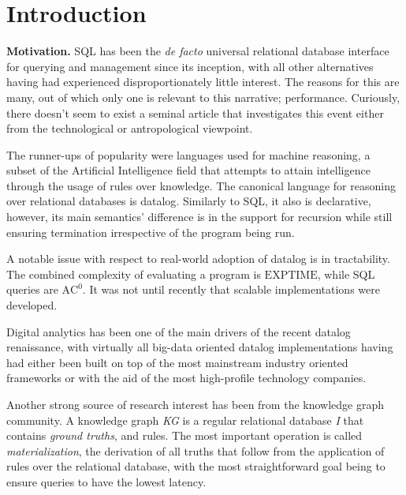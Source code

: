 \documentclass[manuscript,screen,review]{acmart}
\theoremstyle{definition}
\begin{document}

\maketitle

\section{Introduction}
\textbf{Motivation.} SQL has been the \textit{de facto} universal relational
database interface for querying and management since its inception,
with all other alternatives having had experienced disproportionately
little interest. The reasons for this are many, out of which only one
is relevant to this narrative; performance. Curiously, there doesn't seem to exist
a seminal article that investigates this event either from the
technological or antropological viewpoint.

The runner-ups of popularity were languages used for machine reasoning,
a subset of the Artificial Intelligence field that attempts to attain
intelligence through the usage of rules over knowledge. The canonical
language for reasoning over relational databases is datalog\cite{datalog}.
Similarly to SQL, it also is declarative, however, its main semantics' difference
is in the support for recursion while still ensuring termination irrespective
of the program being run.

A notable issue with respect to real-world adoption of datalog is in
tractability. The combined complexity of evaluating a program is
$\text{EXPTIME}$\cite{datalog}, while SQL queries are $\text{AC}^0$. It was
not until recently\cite{rdfox, others?} that scalable implementations were
developed.

Digital analytics has been one of the main drivers of the recent datalog renaissance,
with virtually all big-data oriented datalog implementations having had either been built
on top of the most mainstream industry oriented frameworks\cite{bigdatalog,cog,cog2} or with the
aid of the most high-profile technology companies\cite{logica,yedalog,vadalog}.

Another strong source of research interest has been from the knowledge graph community. A
knowledge graph \textit{KG} is a regular relational database \textit{I} that contains
\textit{ground truths}, and rules. The most important operation is called \textit{materialization},
the derivation of all truths that follow from the application of rules over the relational database,
with the most straightforward goal being to ensure queries to have the lowest latency.
\end{document}
